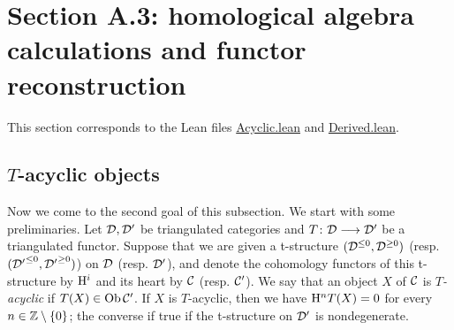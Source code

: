 \section{Section A.3: homological algebra calculations and functor reconstruction}

This section corresponds to the Lean files \url{Acyclic.lean} and \url{Derived.lean}.

\subsection{$T$-acyclic objects}

Now we come to the second goal of this subsection. We start with some preliminaries.
Let $\mathcal{D},\mathcal{D}'$ be triangulated categories and $T\colon \mathcal{D}\longrightarrow\mathcal{D}'$ be a triangulated functor. Suppose that we are given a t-structure $(\mathcal{D}^{\leq 0},\mathcal{D}^{\geq 0})$ (resp. $({\mathcal{D}'}^{\leq 0},{\mathcal{D}'}^{\geq 0})$)
on $\mathcal{D}$ (resp. $\mathcal{D}'$), and denote the cohomology functors of this t-structure by $\mathrm{H}^i$ and its heart by $\mathcal{C}$ (resp. $\mathcal{C}'$).
We say that an object $X$ of $\mathcal{C}$ is \emph{$T$-acyclic} if $T(X)\in\operatorname{\mathrm{Ob}}\mathcal{C}'$. If $X$ is $T$-acyclic, then we have $\mathrm{H}^n T(X)=0$ for every $n\in\mathbb{Z}\setminus\{0\}$; 
the converse if true if the t-structure on $\mathcal{D}'$ is nondegenerate.

